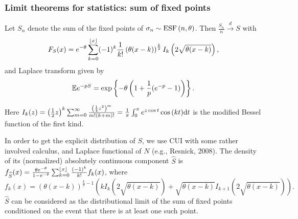 \documentclass[12pt,pdf,aspectratio=169,t]{beamer}
\begin{document}
    \begin{frame}[allowframebreaks]
        \frametitle{Limit theorems for statistics: sum of fixed points}
        \begin{theorem}
            Let $S_n$ denote the sum of the fixed points of $\sigma_n \sim \ESF{n, \theta}$.
            Then $\frac{S_n}{n} \overset{d}{\longrightarrow} S$ with 
            \vspace{-1em}
            \begin{gather}
                F_{S}(x) = e^{-\theta}
                \sum\limits_{k=0}^{\floor*{x}}
                (-1)^k \frac{1}{k!}\left(\theta(x-k)\right)^{\frac{k}{2}} I_k\left(2\sqrt{\theta(x-k)}\right),
            \end{gather}
            and Laplace transform given by
            \vspace{-1em}
            \begin{gather}
                \E e^{-p S} = \exp\left\{- \theta \left( 1 + \frac{1}{p}(e^{-p} - 1)\right) \right\}.
            \end{gather}
            \vspace{-1em}
        \end{theorem}
        Here $I_k(z) = \left(\frac{1}{2} z\right)^{k}
            \sum_{m=0}^{\infty} \frac{
                \left(\frac{1}{4} z^2 \right)^{m}
            }{
                m! (k + m)!
            } = \frac{1}{\pi} \int_0^{\pi} e^{z \cos t} \cos{(kt)} \d t$ is the modified Bessel function of the first kind.

            In order to get the explicit distribution of $S$, we use CUI with some rather involved calculus,
            and Laplace functional of $N$ (e.g., Resnick, 2008).
            The density of its (normalized) absolutely continuous component $\widehat{S}$ is 
            $f_{\widehat{S}}(x) = \frac{\theta e^{-\theta}}{1 - e^{-\theta}}
            \sum_{k=0}^{\floor*{x}} \frac{(-1)^k}{k!} f_k(x)$, where
            $$f_k(x) = \left(\theta (x - k)\right)^{\frac{k}{2} - 1}
            \left(
                k I_k \left(2 \sqrt{\theta (x - k)} \right) + 
                \sqrt{\theta (x - k)} I_{k+1} \left(2 \sqrt{\theta (x - k)}\right)
            \right).$$
            $\widehat{S}$ can be considered as the distributional limit of the sum
            of fixed points conditioned on the event that there is at least one such point.


\end{frame}
\end{document}

